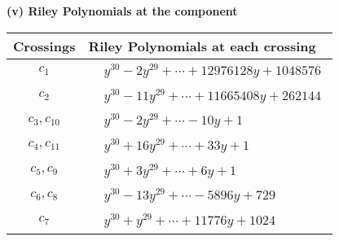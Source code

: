 \documentclass[1p]{elsarticle_modified}
\theoremstyle{definition}
\begin{document}
\flushleft \textbf{(v) Riley Polynomials at the component}\newline \\
\begin{tabular}{m{50pt}|m{274pt}}
Crossings & \hspace{64pt}Riley Polynomials at each crossing \\
\hline $$\begin{aligned}c_{1}\end{aligned}$$&$\begin{aligned}
&y^{30}-2 y^{29}+\cdots+12976128 y+1048576
\end{aligned}$\\
\hline $$\begin{aligned}c_{2}\end{aligned}$$&$\begin{aligned}
&y^{30}-11 y^{29}+\cdots+11665408 y+262144
\end{aligned}$\\
\hline $$\begin{aligned}c_{3},c_{10}\end{aligned}$$&$\begin{aligned}
&y^{30}-2 y^{29}+\cdots-10 y+1
\end{aligned}$\\
\hline $$\begin{aligned}c_{4},c_{11}\end{aligned}$$&$\begin{aligned}
&y^{30}+16 y^{29}+\cdots+33 y+1
\end{aligned}$\\
\hline $$\begin{aligned}c_{5},c_{9}\end{aligned}$$&$\begin{aligned}
&y^{30}+3 y^{29}+\cdots+6 y+1
\end{aligned}$\\
\hline $$\begin{aligned}c_{6},c_{8}\end{aligned}$$&$\begin{aligned}
&y^{30}-13 y^{29}+\cdots-5896 y+729
\end{aligned}$\\
\hline $$\begin{aligned}c_{7}\end{aligned}$$&$\begin{aligned}
&y^{30}+y^{29}+\cdots+11776 y+1024
\end{aligned}$\\
\hline
\end{tabular}\\~\\
\end{document}
